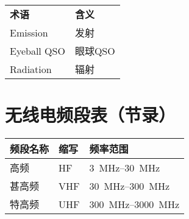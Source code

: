 \begin{longtable}[l]{ll}
	\textbf{术语} & \textbf{含义} \\
	Emission    & 发射          \\
	Eyeball QSO & 眼球QSO       \\
	Radiation   & 辐射          \\
\end{longtable}

\newpage

\section{无线电频段表（节录）}

\begin{longtable}[c]{|l|l|l|}
	\hline
	\textbf{频段名称} & \textbf{缩写}  & \textbf{频率范围}                               \\
	\hline
	高频            & HF  & \qtyrange[range-phrase=--]{3}{30}{\MHz}     \\
	\hline
	甚高频           & VHF & \qtyrange[range-phrase=--]{30}{300}{\MHz}   \\
	\hline
	特高频           & UHF & \qtyrange[range-phrase=--]{300}{3000}{\MHz} \\
	\hline
\end{longtable}

\newpage


